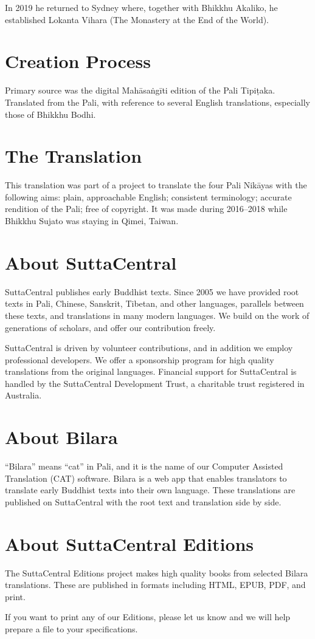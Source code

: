 \documentclass[12pt,openany]{book}%
\begin{document}
In 2019 he returned to Sydney where, together with Bhikkhu Akaliko, he established Lokanta Vihara (The Monastery at the End of the World). 

\section*{Creation Process}

Primary source was the digital \textsanskrit{Mahāsaṅgīti} edition of the Pali \textsanskrit{Tipiṭaka}. Translated from the Pali, with reference to several English translations, especially those of Bhikkhu Bodhi.

\section*{The Translation}

This translation was part of a project to translate the four Pali \textsanskrit{Nikāyas} with the following aims: plain, approachable English; consistent terminology; accurate rendition of the Pali; free of copyright. It was made during 2016–2018 while Bhikkhu Sujato was staying in Qimei, Taiwan.

\section*{About SuttaCentral}

SuttaCentral publishes early Buddhist texts. Since 2005 we have provided root texts in Pali, Chinese, Sanskrit, Tibetan, and other languages, parallels between these texts, and translations in many modern languages. We build on the work of generations of scholars, and offer our contribution freely.

SuttaCentral is driven by volunteer contributions, and in addition we employ professional developers. We offer a sponsorship program for high quality translations from the original languages. Financial support for SuttaCentral is handled by the SuttaCentral Development Trust, a charitable trust registered in Australia.

\section*{About Bilara}

“Bilara” means “cat” in Pali, and it is the name of our Computer Assisted Translation (CAT) software. Bilara is a web app that enables translators to translate early Buddhist texts into their own language. These translations are published on SuttaCentral with the root text and translation side by side.

\section*{About SuttaCentral Editions}

The SuttaCentral Editions project makes high quality books from selected Bilara translations. These are published in formats including HTML, EPUB, PDF, and print.

If you want to print any of our Editions, please let us know and we will help prepare a file to your specifications.

%
\end{document}

